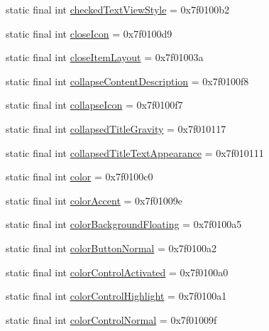 \begin{CompactItemize}
static final int \hyperlink{classandroid_1_1support_1_1v7_1_1appcompat_1_1_r_1_1attr_785c05c29642c0fc9227c8a52b2427b5}{checkedTextViewStyle} = 0x7f0100b2
\item 
static final int \hyperlink{classandroid_1_1support_1_1v7_1_1appcompat_1_1_r_1_1attr_8aad766b7e82de0ca00a8c7ab5159ec4}{closeIcon} = 0x7f0100d9
\item 
static final int \hyperlink{classandroid_1_1support_1_1v7_1_1appcompat_1_1_r_1_1attr_fe652bc1007636ac2e1fba04dda995db}{closeItemLayout} = 0x7f01003a
\item 
static final int \hyperlink{classandroid_1_1support_1_1v7_1_1appcompat_1_1_r_1_1attr_4ab02fd788cddd36bff76138ce43f9eb}{collapseContentDescription} = 0x7f0100f8
\item 
static final int \hyperlink{classandroid_1_1support_1_1v7_1_1appcompat_1_1_r_1_1attr_fbe798ed096eb3218764496c6283e13d}{collapseIcon} = 0x7f0100f7
\item 
static final int \hyperlink{classandroid_1_1support_1_1v7_1_1appcompat_1_1_r_1_1attr_e73f48a452f14d6a31f321acdb48d839}{collapsedTitleGravity} = 0x7f010117
\item 
static final int \hyperlink{classandroid_1_1support_1_1v7_1_1appcompat_1_1_r_1_1attr_d68b6792fd0089d2d7d483d99f5d1047}{collapsedTitleTextAppearance} = 0x7f010111
\item 
static final int \hyperlink{classandroid_1_1support_1_1v7_1_1appcompat_1_1_r_1_1attr_a27542af8948575ddf2292191963870f}{color} = 0x7f0100c0
\item 
static final int \hyperlink{classandroid_1_1support_1_1v7_1_1appcompat_1_1_r_1_1attr_3eaf80e4c15784b4f0238daaaab0a389}{colorAccent} = 0x7f01009e
\item 
static final int \hyperlink{classandroid_1_1support_1_1v7_1_1appcompat_1_1_r_1_1attr_5fac3ace1c5e84c142e7f95b01f8db5b}{colorBackgroundFloating} = 0x7f0100a5
\item 
static final int \hyperlink{classandroid_1_1support_1_1v7_1_1appcompat_1_1_r_1_1attr_9a5be52dd1a8fef91814d62ef4c75105}{colorButtonNormal} = 0x7f0100a2
\item 
static final int \hyperlink{classandroid_1_1support_1_1v7_1_1appcompat_1_1_r_1_1attr_b59f72d5bf38093795bd5857e81f8202}{colorControlActivated} = 0x7f0100a0
\item 
static final int \hyperlink{classandroid_1_1support_1_1v7_1_1appcompat_1_1_r_1_1attr_edd6aba8a6e5bba482017d4880d36f0b}{colorControlHighlight} = 0x7f0100a1
\item 
static final int \hyperlink{classandroid_1_1support_1_1v7_1_1appcompat_1_1_r_1_1attr_093a3eb299ce215468c9739c0906afee}{colorControlNormal} = 0x7f01009f

\end{CompactItemize}
